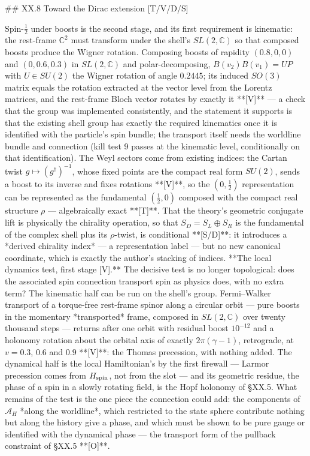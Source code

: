 ## XX.8 Toward the Dirac extension [T/V/D/S]

Spin-$\tfrac12$ under boosts is the second stage, and its first requirement is kinematic: the rest-frame $\mathbb C^2$ must transform under the shell's $SL(2,\mathbb C)$ so that composed boosts produce the Wigner rotation. Composing boosts of rapidity $(0.8,0,0)$ and $(0,0.6,0.3)$ in $SL(2,\mathbb C)$ and polar-decomposing, $B(v_2)B(v_1) = UP$ with $U\in SU(2)$ the Wigner rotation of angle $0.2445$; its induced $SO(3)$ matrix equals the rotation extracted at the vector level from the Lorentz matrices, and the rest-frame Bloch vector rotates by exactly it **[V]** — a check that the group was implemented consistently, and the statement it supports is that the existing shell group has exactly the required kinematics once it is identified with the particle's spin bundle; the transport itself needs the worldline bundle and connection (kill test 9 passes at the kinematic level, conditionally on that identification). The Weyl sectors come from existing indices: the Cartan twist $g\mapsto(g^\dagger)^{-1}$, whose fixed points are the compact real form $SU(2)$, sends a boost to its inverse and fixes rotations **[V]**, so the $(0,\tfrac12)$ representation can be represented as the fundamental $(\tfrac12,0)$ composed with the compact real structure $\rho$ — algebraically exact **[T]**. That the theory's geometric conjugate lift is physically the chirality operation, so that $S_D = S_L\oplus S_R$ is the fundamental of the complex shell plus its $\rho$-twist, is conditional **[S/D]**: it introduces a *derived chirality index* — a representation label — but no new canonical coordinate, which is exactly the author's stacking of indices. **The local dynamics test, first stage [V].** The decisive test is no longer topological: does the associated spin connection transport spin as physics does, with no extra term? The kinematic half can be run on the shell's group. Fermi–Walker transport of a torque-free rest-frame spinor along a circular orbit — pure boosts in the momentary *transported* frame, composed in $SL(2,\mathbb C)$ over twenty thousand steps — returns after one orbit with residual boost $10^{-12}$ and a holonomy rotation about the orbital axis of exactly $2\pi(\gamma-1)$, retrograde, at $v = 0.3$, $0.6$ and $0.9$ **[V]**: the Thomas precession, with nothing added. The dynamical half is the local Hamiltonian's by the first firewall — Larmor precession comes from $H_{\rm spin}$, not from the slot — and its geometric residue, the phase of a spin in a slowly rotating field, is the Hopf holonomy of §XX.5. What remains of the test is the one piece the connection could add: the components of $\mathcal A_H$ *along the worldline*, which restricted to the state sphere contribute nothing but along the history give a phase, and which must be shown to be pure gauge or identified with the dynamical phase — the transport form of the pullback constraint of §XX.5 **[O]**.

